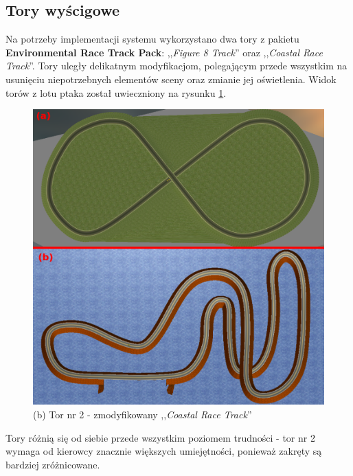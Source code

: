 \newpage
\subsection{Tory wyścigowe}
\label{RaceTracksSection}
Na potrzeby implementacji systemu wykorzystano dwa tory z pakietu \textbf{Environmental Race Track Pack}: ,,\textit{Figure 8 Track}'' oraz ,,\textit{Coastal Race Track}''. Tory uległy delikatnym modyfikacjom, polegającym przede wszystkim na usunięciu niepotrzebnych elementów sceny oraz zmianie jej oświetlenia. Widok torów z lotu ptaka został uwieczniony na rysunku \ref{RaceTracksFig}. \\

\begin{figure}[h]
\begin{center}
\includegraphics[width=14.5cm]{resources/figures/race_tracks_marked.png}
\caption{Tory wyścigowe wykorzystane w projekcie.}
\vspace*{-0.3cm}
\caption*{(a) Tor nr 1 - zmodyfikowany ,,\textit{Figure 8 Track}''}
\vspace*{-0.3cm}
\caption*{(b) Tor nr 2 - zmodyfikowany ,,\textit{Coastal Race Track}''}
\label{RaceTracksFig}
\end{center}
\end{figure}

\vspace{-0.5cm}
Tory różnią się od siebie przede wszystkim poziomem trudności - tor nr 2 wymaga od kierowcy znacznie większych umiejętności, ponieważ zakręty są bardziej zróżnicowane.

